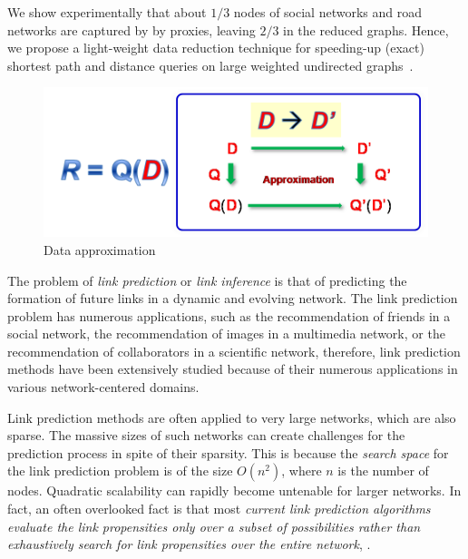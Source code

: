 We show experimentally that about $1/3$  nodes of social networks and road networks  are captured by by proxies, leaving $2/3$ in the reduced graphs.
Hence, we propose a light-weight data reduction technique for speeding-up (exact)  shortest path and distance queries on large weighted undirected graphs~\cite{MaFLWCH16}.




\begin{figure}[tb!]
  \vspace{-1ex}
  \begin{center}
  \includegraphics[scale=0.45]{./dataApprox.png}
  \end{center}
  \vspace{-3ex}
  \caption{Data approximation}\label{fig-tech-dataappro}
  \vspace{-2ex}
\end{figure}


The problem of {\em link prediction} or {\em link inference} is that of predicting the formation of future links in a dynamic and
evolving network. The link prediction problem has numerous
applications, such as the recommendation of friends in a social
network, the recommendation of images in a multimedia network, or
the recommendation of collaborators in a scientific network, therefore, link
prediction methods have been extensively studied  because of their numerous applications in various network-centered domains.


Link prediction methods are often applied to very large networks, which are also sparse.  The massive sizes of such networks can
create challenges for the prediction process in spite of their sparsity. This is because the {\em search space} for the link
prediction problem is of the size $O(n^2)$, where $n$ is the number of nodes. Quadratic scalability can rapidly become untenable for
larger networks. In fact, an often overlooked fact is that most {\em current link prediction algorithms evaluate the link
propensities only over a subset of possibilities rather than exhaustively search for link propensities over the entire network}, \eg \cite{dwang,lee,zhao2016,zhu2016}.


